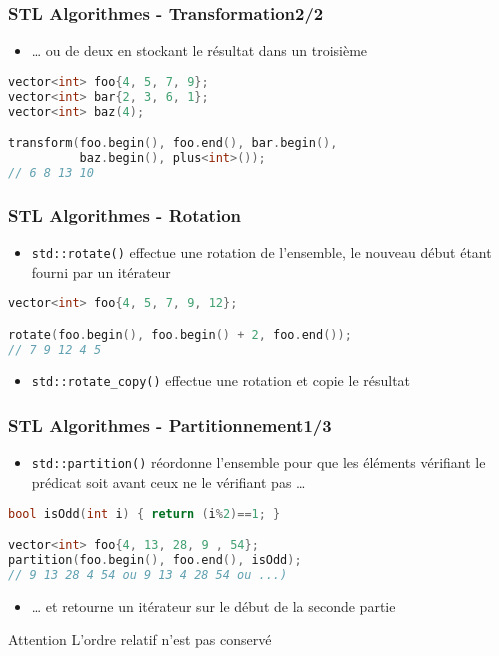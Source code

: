 \documentclass[C++.tex]{subfiles}
\begin{document}
\begin{frame}[fragile]
	\frametitle{STL Algorithmes - Transformation\titlehfill{}2/2}
	\begin{itemize}
		\item \ldots{} ou de deux en stockant le résultat dans un troisième
	\end{itemize}

	\begin{lstlisting}[language=C++]
vector<int> foo{4, 5, 7, 9};
vector<int> bar{2, 3, 6, 1};
vector<int> baz(4);

transform(foo.begin(), foo.end(), bar.begin(), 
          baz.begin(), plus<int>());
// 6 8 13 10\end{lstlisting}
\end{frame}

\begin{frame}[fragile]
	\frametitle{STL Algorithmes - Rotation}
	\begin{itemize}
		\item \lstinline|std::rotate()| effectue une rotation de l'ensemble, le nouveau début étant fourni par un itérateur
	\end{itemize}

	\begin{lstlisting}[language=C++]
vector<int> foo{4, 5, 7, 9, 12};

rotate(foo.begin(), foo.begin() + 2, foo.end());
// 7 9 12 4 5\end{lstlisting}

	\begin{itemize}
		\item \lstinline|std::rotate_copy()| effectue une rotation et copie le résultat
	\end{itemize}
\end{frame}

\begin{frame}[fragile]
	\frametitle{STL Algorithmes - Partitionnement\titlehfill{}1/3}
	\begin{itemize}
		\item \lstinline|std::partition()| réordonne l'ensemble pour que les éléments vérifiant le prédicat soit avant ceux ne le vérifiant pas \ldots
	\end{itemize}

	\begin{lstlisting}[language=C++]
bool isOdd(int i) { return (i%2)==1; }

vector<int> foo{4, 13, 28, 9 , 54};
partition(foo.begin(), foo.end(), isOdd);
// 9 13 28 4 54 ou 9 13 4 28 54 ou ...)\end{lstlisting}


	\begin{itemize}
		\item \ldots{} et retourne un itérateur sur le début de la seconde partie
	\end{itemize}

	\begin{alertblock}{Attention}
		L'ordre relatif n'est pas conservé
	\end{alertblock}
\end{frame}
\end{document}
